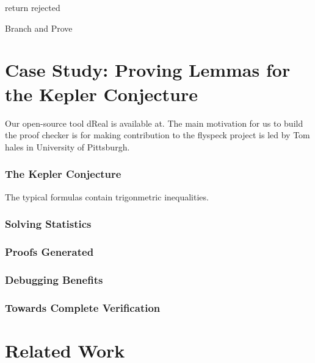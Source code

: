 \documentclass[envcountsect]{llncs}
\begin{document}
\begin{algorithm}
\BlankLine
{}
return {\sf rejected}\;
\caption{Branch and Prove\label{algo1}}
\end{algorithm}



\section{Case Study: Proving Lemmas for the Kepler Conjecture}\label{kepler}

Our open-source tool dReal is available at. The main motivation for us to build
the proof checker is for making contribution to the flyspeck project is led
by Tom hales in University of Pittsburgh. 

\subsubsection{The Kepler Conjecture}

The typical formulas contain trigonmetric inequalities.

\subsubsection{Solving Statistics}



\subsubsection{Proofs Generated}



\subsubsection{Debugging Benefits}


\subsubsection{Towards Complete Verification}




\section{Related Work}\label{related}
\end{document}
